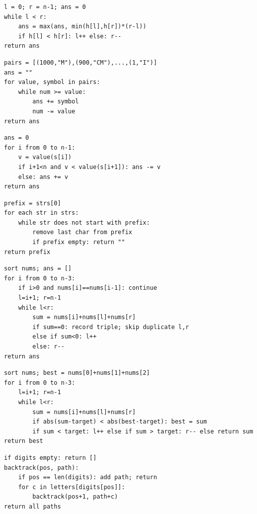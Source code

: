 \documentclass[11pt,a4paper]{ctexart}
\begin{document}
\begin{verbatim}
l = 0; r = n-1; ans = 0
while l < r:
    ans = max(ans, min(h[l],h[r])*(r-l))
    if h[l] < h[r]: l++ else: r--
return ans
\end{verbatim}

\begin{verbatim}
pairs = [(1000,"M"),(900,"CM"),...,(1,"I")]
ans = ""
for value, symbol in pairs:
    while num >= value:
        ans += symbol
        num -= value
return ans
\end{verbatim}

\begin{verbatim}
ans = 0
for i from 0 to n-1:
    v = value(s[i])
    if i+1<n and v < value(s[i+1]): ans -= v
    else: ans += v
return ans
\end{verbatim}

\begin{verbatim}
prefix = strs[0]
for each str in strs:
    while str does not start with prefix:
        remove last char from prefix
        if prefix empty: return ""
return prefix
\end{verbatim}

\begin{verbatim}
sort nums; ans = []
for i from 0 to n-3:
    if i>0 and nums[i]==nums[i-1]: continue
    l=i+1; r=n-1
    while l<r:
        sum = nums[i]+nums[l]+nums[r]
        if sum==0: record triple; skip duplicate l,r
        else if sum<0: l++
        else: r--
return ans
\end{verbatim}

\begin{verbatim}
sort nums; best = nums[0]+nums[1]+nums[2]
for i from 0 to n-3:
    l=i+1; r=n-1
    while l<r:
        sum = nums[i]+nums[l]+nums[r]
        if abs(sum-target) < abs(best-target): best = sum
        if sum < target: l++ else if sum > target: r-- else return sum
return best
\end{verbatim}

\begin{verbatim}
if digits empty: return []
backtrack(pos, path):
    if pos == len(digits): add path; return
    for c in letters[digits[pos]]:
        backtrack(pos+1, path+c)
return all paths
\end{verbatim}
\end{document}
